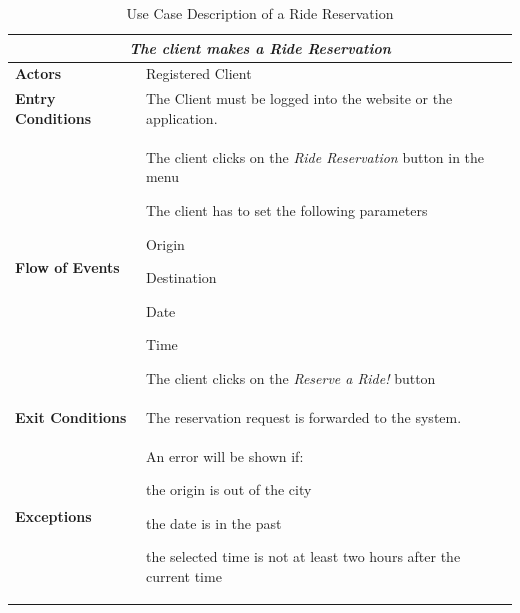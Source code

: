 \documentclass[a4paper]{article}
\begin{document}
\begin{table} [H]
\begin{center}
\begin{tabular}{ |m{}|m{}|  }
\hline
    \multicolumn{2}{|c|}{\textbf{\textit{The client makes a Ride Reservation }}} \\
\hline \hline
    \textbf{Actors}
&   Registered Client
\\ \hline
    \textbf{Entry Conditions}
&   The Client must be logged into the website or the application.
\\ \hline
    \textbf{Flow of Events}
& 
    \begin{enumerate*}
    \item The client clicks on the \emph{Ride Reservation} button in the menu
    \item The client has to set the following parameters
        \begin{enumerate*}
        \item Origin
        \item Destination
        \item Date
        \item Time
        \end{enumerate*}
    \item The client clicks on the \emph{Reserve a Ride!} button
    \end{enumerate*}
\\ \hline
    \textbf{Exit Conditions}
&   The reservation request is forwarded to the system.
\\ \hline
    \textbf{Exceptions}
&   An error will be shown if:
    \begin{itemize*}
    \item the origin is out of the city
    \item the date is in the past
    \item the selected time is not at least two hours after the current time
    \end{itemize*}
\\ \hline
\end{tabular}
\end{center}
\caption{Use Case Description of a Ride Reservation}
\label{table:clientridereservation}
\end{table}
\end{document}
